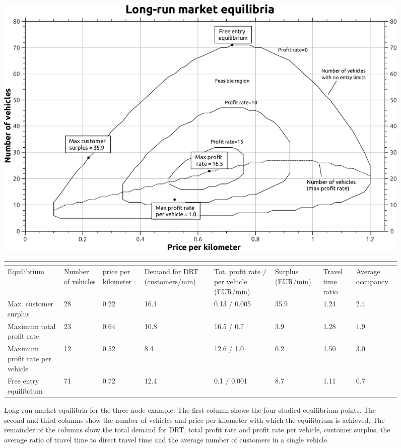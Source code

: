 \documentclass[dissertation,draft*]{aaltoseries}
\begin{document}
\begin{figure}[ht]
\begin{center}
\includegraphics[width=0.9\columnwidth]{a-equilibria01}
\\
{\scriptsize
\begin{tabular}{|p{2.0cm}|p{1.0cm}|p{1.0cm}|p{1.5cm}|p{1.4cm}|p{1.2cm}|p{0.75cm}|p{0.9cm}|}
\multicolumn{8}{c}{} \\
\hline
Equilibrium & Number of vehicles & price per kilometer & Demand for DRT (customers/min) & 
Tot. profit rate / per vehicle (EUR/min) & Surplus (EUR/min) & Travel time ratio & Average occupancy \\
\hline
Max. customer surplus & 28 & 0.22 & 16.1 & 0.13 / 0.005 & 35.9 & 1.24 & 2.4 \\
\hline
Maximum total profit rate & 23 & 0.64 & 10.8 & 16.5 / 0.7 & 3.9 & 1.28 & 1.9 \\
\hline
Maximum profit rate per vehicle & 12 & 0.52 & 8.4 & 12.6 / 1.0 & 0.2 & 1.50 & 3.0 \\
\hline
Free entry equilibrium & 71 & 0.72 & 12.4 & 0.1 / 0.001 & 8.7 & 1.11 & 0.7 \\
\hline
\end{tabular}
}
\caption{Long-run market equilibria for the three node example. The first column shows the
four studied equilibrium points. The second and third columns show the 
number of vehicles and price per kilometer with which the equilibrium is achieved.
The remainder of the columns show the total demand for DRT, total profit rate and profit rate
per vehicle, customer surplus, the average ratio of travel time to direct travel time
and the average number of customers in a single vehicle.}
\label{a-equilibria01}
\end{center}
\end{figure}
\end{document}
